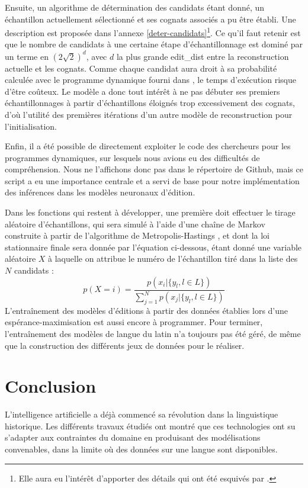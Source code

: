 \documentclass[12pt, twoside]{report}
\begin{document}
\vspace{12pt}
Ensuite, un algorithme de détermination des candidats étant donné, un échantillon actuellement sélectionné et ses \glspl{cognat} associés a pu être établi. Une description est proposée dans l'annexe \ref{deter-candidats}\footnote{Elle aura eu l'intérêt d'apporter des détails qui ont été esquivés par \cite{he2022neural}.}.
Ce qu'il faut retenir est que le nombre de candidats à une certaine étape d'échantillonnage est dominé par un terme en $(2\sqrt{2})^d$, avec $d$ la plus grande \gls{edit_dist} entre la reconstruction actuelle et les \glspl{cognat}. Comme chaque candidat aura droit à sa probabilité calculée avec le programme dynamique fourni dans \autocite[section A.2]{he2022neural}, le temps d'exécution risque d'être coûteux. Le modèle a donc tout intérêt à ne pas débuter ses premiers échantillonnages à partir d'échantillons éloignés trop excessivement des \glspl{cognat}, d'où l'utilité des premières itérations d'un autre modèle de reconstruction pour l'initialisation.

\vspace{12pt}
Enfin, il a été possible de directement exploiter le code des chercheurs pour les programmes dynamiques, sur lesquels nous avions eu des difficultés de compréhension. Nous ne l'affichons donc pas dans le répertoire de Github, mais ce script a eu une importance centrale et a servi de base pour notre implémentation des inférences dans les modèles neuronaux d'édition.

\vspace{12pt}
Dans les fonctions qui restent à développer, une première doit effectuer le tirage aléatoire d'échantillons, qui sera simulé à l'aide d'une chaîne de Markov construite à partir de l'algorithme de Metropolis-Hastings \autocite{metro_has}, et dont la loi stationnaire finale sera donnée par l'équation ci-dessous, étant donné une variable aléatoire $X$ à laquelle on attribue le numéro de l'échantillon tiré dans la liste des $N$ candidats :
\begin{equation}
    p(X=i)=\frac{p(x_i|\{y_l, l\in L\})}{\sum_{j=1}^{N}p(x_j|\{y_l, l\in L\})}
\end{equation}
L'entraînement des modèles d'éditions à partir des données établies lors d'une espérance-maximisation est aussi encore à programmer. Pour terminer, l'entraînement des modèles de langue du latin n'a toujours pas été géré, de même que la construction des différents jeux de données pour le réaliser.

\chapter{Conclusion}
L'intelligence artificielle a déjà commencé sa révolution dans la linguistique historique. Les différents travaux étudiés ont montré que ces technologies ont su s'adapter aux contraintes du domaine en produisant des modélisations convenables, dans la limite où des données sur une langue sont disponibles. 
\end{document}
